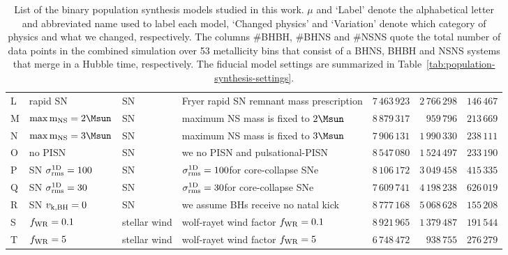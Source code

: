 \begin{table*}
{\begin{tabular}{|l|lll|rrr|}
%
%
L       & rapid SN		& SN                   				& Fryer rapid {SN} remnant mass prescription   	 & $7\,463\,923$	&  $2\,766\,298$ &  $ 146\,467$   \\
%
M      & $\rm{max} \, m_{\rm{NS}} = 2\Msun$		& SN                 				& maximum NS mass is fixed to $2\Msun$   	 & $8\,879\,317$	&  $959\,796$   & $213\,669$    \\
%
N        & $\rm{max} \, m_{\rm{NS}} = 3\Msun$		& SN                 				& maximum NS mass is fixed to $3\Msun$    & 	$7\,906\,131$	& $1\,990\,330$ & $238\,111$  \\
%
O       & no PISN		& SN                   				& we no  PISN and pulsational-PISN  	& $8\,547\,080$	& $1\,524\,497$  & $233\,190$   \\
%
P      	 & SN $\sigma_{\rm{rms}}^{\rm{1D}}=100$\kms 	& SN                 				& $\sigma_{\rm{rms}}^{\rm{1D}}=100$\kms  	for core-collapse {SNe}	& $8\,106\,172$ & $3\,049\,458$ & $415\,335$  \\  
%
Q        & SN $\sigma_{\rm{rms}}^{\rm{1D}}=30$\kms 		& SN                  				& $\sigma_{\rm{rms}}^{\rm{1D}}=30$\kms  	for core-collapse {SNe} & $7\,609\,741$	& $4\,198\,238$  & $626\,019$  \\ 
%
R       & SN $v_{\rm{k,BH}} = 0$		& SN                   				& we assume \acp{BH} receive no natal kick   &	$8\,777\,168$	& $5\,068\,628$  & $155\,208$ \\
\hline
%
%
S       &$f_{\rm{WR}}=0.1$		& {stellar wind}                    				&   wolf-rayet wind factor $f_{\rm{WR}} = 0.1$  & $8\,921\,965$	& $1\,379\,487$ 	& $191\,544$ 	  \\
%
T        & $f_{\rm{WR}}=5$			& {stellar wind}                    				& wolf-rayet wind factor $f_{\rm{WR}} = 5$	    & $6\,748\,472$	& 	$938\,755$ & $276\,279$ 	\\
%
%
\hline \hline
\end{tabular}%
}
\caption{List of the \NmodelsBPS binary population synthesis models studied in this work. $\mu$ and `Label' denote the alphabetical letter and abbreviated name used to label each model, `Changed physics' and `Variation' denote which category of physics and what we changed, respectively. The columns $\#$BHBH, $\#$BHNS and $\#$NSNS quote the total number of data points in the combined simulation over 53 metallicity bins that consist of a \ac{BHNS}, \ac{BHBH} and \ac{NSNS}  systems that merge in a Hubble time, respectively.   The fiducial model settings are summarized in Table~\ref{tab:population-synthesis-settings}.}
\label{tab:variations-BPS-more-detailed}
\centering
\end{table*}
%
